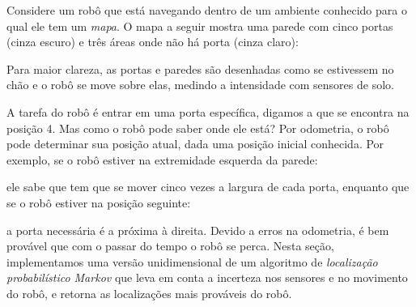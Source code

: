 Considere um robô que está navegando dentro de um ambiente conhecido para o qual ele tem um \emph{mapa}. O mapa a seguir mostra uma parede com cinco portas (cinza escuro) e três áreas onde não há porta (cinza claro):

\begin{center}
\end{center}

Para maior clareza, as portas e paredes são desenhadas como se estivessem no chão e o robô se move sobre elas, medindo a intensidade com sensores de solo.

A tarefa do robô é entrar em uma porta específica, digamos a que se encontra na posição 4. Mas como o robô pode saber onde ele está? Por odometria, o robô pode determinar sua posição atual, dada uma posição inicial conhecida. Por exemplo, se o robô estiver na extremidade esquerda da parede:
\begin{center}
\end{center}
ele sabe que tem que se mover cinco vezes a largura de cada porta, enquanto que se o robô estiver na posição seguinte:
\begin{center}
\end{center}
a porta necessária é a próxima à direita. Devido a erros na odometria, é bem provável que com o passar do tempo o robô se perca. Nesta seção, implementamos uma versão unidimensional de um algoritmo de \emph{localização probabilístico Markov} que leva em conta a incerteza nos sensores e no movimento do robô, e retorna as localizações mais prováveis do robô.

